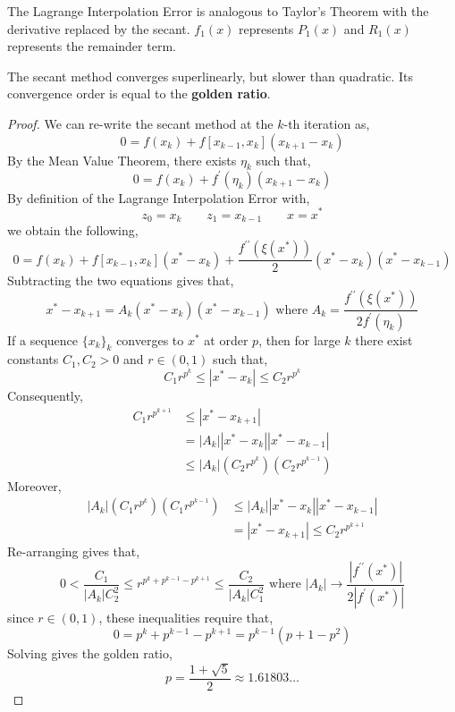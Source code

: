 \begin{rmk}
\sloppy The Lagrange Interpolation Error is analogous to Taylor's Theorem with the derivative replaced by the secant. $f_1(x)$ represents $P_1(x)$ and $R_1(x)$ represents the remainder term.
\end{rmk}

\begin{thm}
   The secant method converges superlinearly, but slower than quadratic. Its convergence order is equal to the \textbf{golden ratio}.
\end{thm}

\begin{proof}
   We can re-write the secant method at the $k$-th iteration as,
   \[
    0=f\left(x_k\right)+f\left[x_{k-1}, x_k\right]\left(x_{k+1}-x_k\right)
    \]
   By the Mean Value Theorem, there exists $\eta_k$ such that,
    \[0 = f\left(x_k\right)+f^{\prime}\left(\eta_k\right)\left(x_{k+1}-x_k\right)\]
   By definition of the Lagrange Interpolation Error with,
   \[z_0=x_k \quad \quad z_1=x_{k-1} \quad \quad x=x^*\]
   we obtain the following,
   \[0=f\left(x_k\right)+f\left[x_{k-1}, x_k\right]\left(x^*-x_k\right)+\frac{f^{\prime \prime}\left(\xi\left(x^*\right)\right)}{2}\left(x^*-x_k\right)\left(x^*-x_{k-1}\right)\]
Subtracting the two equations gives that,
\[x^*-x_{k+1}=A_k\left(x^*-x_k\right)\left(x^*-x_{k-1}\right) \text{ where } A_k = \frac{f^{\prime \prime}\left(\xi\left(x^*\right)\right)}{2 f^{\prime}\left(\eta_k\right)}\]
If a sequence $\{x_k\}_k$ converges to $x^*$ at order $p$, then for large $k$ there exist constants $C_1, C_2 > 0$ and $r \in (0, 1)$ such that,
\[C_1 r^{p^k} \leq\left|x^*-x_k\right| \leq C_2 r^{p^k}\]
Consequently,
\begin{align*}
C_1 r^{p^{k+1}} &\leq\left|x^*-x_{k+1}\right| \\
&=\left|A_k\right|\left|x^*-x_k\right|\left|x^*-x_{k-1}\right| \\
&\leq\left|A_k\right|\left(C_2 r^{p^k}\right)\left(C_2 r^{p^{k-1}}\right)
\end{align*}
Moreover,
\begin{align*}
    \left|A_k\right|\left(C_1 r^{p^k}\right)\left(C_1 r^{p^{k-1}}\right) &\leq\left|A_k\right|\left|x^*-x_k\right|\left|x^*-x_{k-1}\right| \\
    &=\left|x^*-x_{k+1}\right| \leq C_2 r^{p^{k+1}}
\end{align*}
Re-arranging gives that,
\[0<\frac{C_1}{\left|A_k\right| C_2^2} \leq r^{p^k+p^{k-1}-p^{k+1}} \leq \frac{C_2}{\left|A_k\right| C_1^2} \text{ where } \left|A_k\right| \rightarrow \frac{\left|f^{\prime \prime}\left(x^*\right)\right|}{2\left|f^{\prime}\left(x^*\right)\right|}\]
since $r \in (0, 1)$, these inequalities require that,
\[0=p^k+p^{k-1}-p^{k+1}=p^{k-1}\left(p+1-p^2\right)\]
Solving gives the golden ratio,
\[p=\frac{1+\sqrt{5}}{2} \approx 1.61803 \ldots\]
\end{proof}

